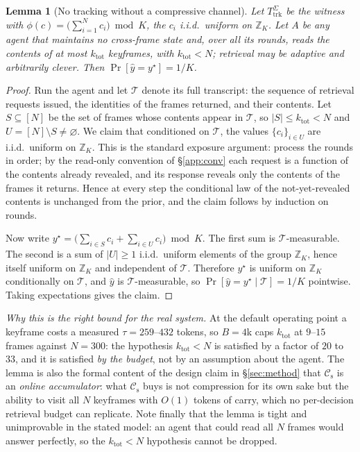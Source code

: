 \documentclass[10pt]{article}
\newtheorem{lemma}{Lemma}
\theoremstyle{definition}
\theoremstyle{plain}
\newcommand{\cs}{\mathcal{C}_{\mathrm{s}}}
\begin{document}
\begin{lemma}[No tracking without a compressive channel]
\label{lem:vtrack}
Let $T_{\mathrm{trk}}^{\Sigma}$ be the witness with $\phi(c)=\bigl(\sum_{i=1}^{N}c_i\bigr)\bmod K$, the $c_i$ i.i.d.\ uniform on $\mathbb{Z}_K$. Let $A$ be any agent that maintains \emph{no} cross-frame state and, over all its rounds, reads the contents of at most $k_{\mathrm{tot}}$ keyframes, with $k_{\mathrm{tot}}<N$; retrieval may be adaptive and arbitrarily clever. Then $\Pr[\hat y=y^{\star}]=1/K$.
\end{lemma}
\begin{proof}
Run the agent and let $\mathcal{T}$ denote its full transcript: the sequence of retrieval requests issued, the identities of the frames returned, and their contents. Let $S\subseteq[N]$ be the set of frames whose contents appear in $\mathcal{T}$, so $|S|\le k_{\mathrm{tot}}<N$ and $U=[N]\setminus S\neq\varnothing$. We claim that conditioned on $\mathcal{T}$, the values $\{c_i\}_{i\in U}$ are i.i.d.\ uniform on $\mathbb{Z}_K$. This is the standard exposure argument: process the rounds in order; by the read-only convention of \S\ref{app:conv} each request is a function of the contents already revealed, and its response reveals only the contents of the frames it returns. Hence at every step the conditional law of the not-yet-revealed contents is unchanged from the prior, and the claim follows by induction on rounds.

Now write $y^{\star}=\bigl(\sum_{i\in S}c_i+\sum_{i\in U}c_i\bigr)\bmod K$. The first sum is $\mathcal{T}$-measurable. The second is a sum of $|U|\ge1$ i.i.d.\ uniform elements of the group $\mathbb{Z}_K$, hence itself uniform on $\mathbb{Z}_K$ and independent of $\mathcal{T}$. Therefore $y^{\star}$ is uniform on $\mathbb{Z}_K$ conditionally on $\mathcal{T}$, and $\hat y$ is $\mathcal{T}$-measurable, so $\Pr[\hat y=y^{\star}\mid\mathcal{T}]=1/K$ pointwise. Taking expectations gives the claim.
\end{proof}

\emph{Why this is the right bound for the real system.} At the default operating point a keyframe costs a measured $\tau=259$--$432$ tokens, so $B=4$k caps $k_{\mathrm{tot}}$ at $9$--$15$ frames against $N=300$: the hypothesis $k_{\mathrm{tot}}<N$ is satisfied by a factor of $20$ to $33$, and it is satisfied \emph{by the budget}, not by an assumption about the agent. The lemma is also the formal content of the design claim in \S\ref{sec:method} that $\cs$ is an \emph{online accumulator}: what $\cs$ buys is not compression for its own sake but the ability to visit all $N$ keyframes with $O(1)$ tokens of carry, which no per-decision retrieval budget can replicate. Note finally that the lemma is tight and unimprovable in the stated model: an agent that could read all $N$ frames would answer perfectly, so the $k_{\mathrm{tot}}<N$ hypothesis cannot be dropped.
\end{document}
